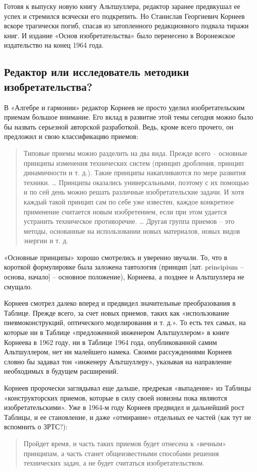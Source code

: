 \documentclass[11pt,a4paper]{article}
\begin{document}
Готовя к выпуску новую книгу Альтшуллера, редактор заранее предвкушал ее успех
и стремился всячески его подкрепить. Но Станислав Георгиевич Корнеев вскоре
трагически погиб, спасая из затопленного редакционного подвала тиражи книг. И
издание «Основ изобретательства» \cite{Altshuller1964} было перенесено в
Воронежское издательство на конец 1964 года.

\subsection*{Редактор или исследователь методики изобретательства?}

В «Алгебре и гармонии» редактор Корнеев не просто уделил изобретательским
приемам большое внимание. Его вклад в развитие этой темы сегодня можно было бы
назвать серьезной авторской разработкой. Ведь, кроме всего прочего, он
предложил и свою классификацию приемов:
\begin{quote}
  Типовые приемы можно разделить на два вида. Прежде всего -- основные
  принципы изменения технических систем (принцип дробления, принцип
  динамичности и т. д.). Такие принципы накапливаются по мере развития
  техники. … Принципы оказались универсальными, поэтому с их помощью и по сей
  день можно решать различные изобретательские задачи. И хотя каждый такой
  принцип сам по себе уже известен, каждое конкретное применение считается
  новым изобретением, если при этом удается устранить техническое
  противоречие. … Другая группа приемов -- это методы, основанные на
  использовании новых материалов, новых видов энергии и т. д.
\end{quote}
«Основные принципы» хорошо смотрелись и уверенно звучали. То, что в короткой
формулировке была заложена тавтология (принцип [лат. principium -- основа,
  начало] -- основное положение), Корнеева, а позднее и Альтшуллера не
смущало.

Корнеев смотрел далеко вперед и предвидел значительные преобразования в
Таблице. Прежде всего, за счет новых приемов, таких как «использование
пневмоконструкций, оптического моделирования и т. д.». То есть тех самых, на
которые ни в Таблице «предложенной инженером Альтшуллером» в книге Корнеева в
1962 году, ни в Таблице 1964 года, опубликованной самим Альтшуллером, нет ни
малейшего намека. Своими рассуждениями Корнеев словно бы задавал тон «инженеру
Альтшуллеру», указывая на направление необходимых в будущем расширений.

Корнеев пророчески заглядывал еще дальше, предрекая «выпадение» из Таблицы
«конструкторских приемов, которые в силу своей новизны пока являются
изобретательскими». Уже в 1964-м году Корнеев предвидел и дальнейший рост
Таблицы, и ее становление, и даже «отмирание» отдельных ее частей (как тут не
вспомнить о ЗРТС?):
\begin{quote}
  Пройдет время, и часть таких приемов будет отнесена к «вечным» принципам, а
  часть станет общеизвестными способами решения технических задач, а не будет
  считаться изобретательством.
\end{quote}
\clearpage
\end{document}
